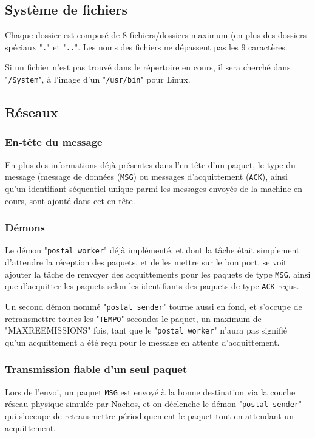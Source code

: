 \documentclass{article}
\begin{document}
{	\subsection{Système de fichiers}
		{Chaque dossier est composé de 8 fichiers/dossiers maximum (en plus des dossiers spéciaux "\texttt{.}" et "\texttt{..}". Les noms des fichiers ne dépassent pas les 9 caractères.}
		~\par{Si un fichier n'est pas trouvé dans le répertoire en cours, il sera cherché dans "\texttt{/System}", à l'image d'un "\texttt{/usr/bin}" pour Linux.}
		
	\subsection{Réseaux}
		\subsubsection{En-tête du message}
			{En plus des informations déjà présentes dans l'en-tête d'un paquet, le type du message (message de données (\texttt{MSG}) ou messages d'acquittement (\texttt{ACK}), ainsi qu'un identifiant séquentiel unique parmi les messages envoyés de la machine en cours, sont ajouté dans cet en-tête.}
		\subsubsection{Démons}
			{Le démon "\texttt{postal worker}" déjà implémenté, et dont la tâche était simplement d'attendre la réception des paquets, et de les mettre sur le bon port, se voit ajouter la tâche de renvoyer des acquittements pour les paquets de type \texttt{MSG}, ainsi que d'acquitter les paquets selon les identifiants des paquets de type \texttt{ACK} reçus.}
			~\par{Un second démon nommé "\texttt{postal sender}" tourne aussi en fond, et s'occupe de retransmettre toutes les "\texttt{TEMPO}" secondes le paquet, un maximum de "{MAXREEMISSIONS}" fois, tant que le "\texttt{postal worker}" n'aura pas signifié qu'un acquittement a été reçu pour le message en attente d'acquittement.}
		\subsubsection{Transmission fiable d'un seul paquet }
			{Lors de l'envoi, un paquet \texttt{MSG} est envoyé à la bonne destination via la couche réseau physique simulée par Nachos, et on déclenche le démon "\texttt{postal sender}" qui s'occupe de retransmettre périodiquement le paquet tout en attendant un acquittement.
}}
\end{document}
